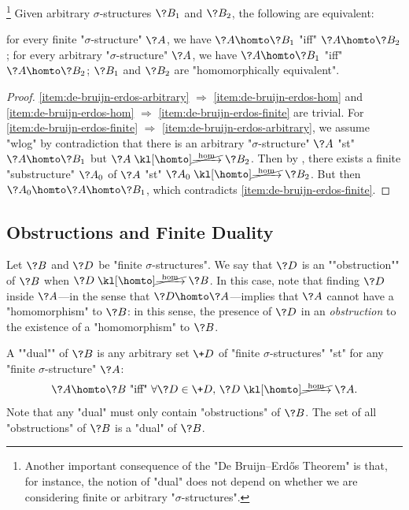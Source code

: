 \begin{corollary}
	\!\footnote{Another important consequence of the "De Bruijn–Erdős Theorem" is that,
	for instance, the notion of "dual" does not depend on whether we are considering finite or
	arbitrary "$\sigma$-structures".}
	\AP\label{coro:de-bruijn-erdos}
	Given arbitrary $\sigma$-structures $\?B_1$ and $\?B_2$, the following are equivalent:
	\begin{enumerate}
		\itemAP\label{item:de-bruijn-erdos-finite} for every finite "$\sigma$-structure" $\?A$, we have $\?A \homto \?B_1$
		"iff" $\?A \homto \?B_2$;
		\itemAP\label{item:de-bruijn-erdos-arbitrary} for every arbitrary "$\sigma$-structure" $\?A$, we have $\?A \homto \?B_1$
			"iff" $\?A \homto \?B_2$;
		\itemAP\label{item:de-bruijn-erdos-hom} $\?B_1$ and $\?B_2$ are "homomorphically equivalent".
	\end{enumerate}
\end{corollary}
\begin{proof}
	\eqref{item:de-bruijn-erdos-arbitrary} $\Rightarrow$ \eqref{item:de-bruijn-erdos-hom}
	and \eqref{item:de-bruijn-erdos-hom} $\Rightarrow$ \eqref{item:de-bruijn-erdos-finite}
	are trivial.
	For \eqref{item:de-bruijn-erdos-finite} $\Rightarrow$ \eqref{item:de-bruijn-erdos-arbitrary},
	we assume "wlog" by contradiction that there is an arbitrary "$\sigma$-structure" $\?A$ "st" $\?A \homto \?B_1$ but $\?A \nothomto \?B_2$. Then by ,
	there exists a finite "substructure" $\?A_0$ of $\?A$ "st" $\?A_0 \nothomto \?B_2$.
	But then $\?A_0 \homto \?A \homto \?B_1$, which contradicts \eqref{item:de-bruijn-erdos-finite}.
\end{proof}


\subsection{Obstructions and Finite Duality}

Let $\?B$ and $\?D$ be "finite $\sigma$-structures".
We say that $\?D$ is an \AP""obstruction"" of $\?B$ when $\?D \nothomto \?B$.
In this case, note that finding $\?D$ inside $\?A$---in the sense that $\?D \homto \?A$---implies that $\?A$ cannot have a "homomorphism" to $\?B$: in this sense, the presence of
$\?D$ in an \emph{obstruction} to the existence of a "homomorphism" to $\?B$.

A \AP""dual"" of $\?B$ is any arbitrary set $\+D$ of "finite $\sigma$-structures" "st"
for any "finite $\sigma$-structure" $\?A$:
\[
	\?A \homto \?B
	\text{ "iff" }
	\forall \?D \in \+D,\, \?D \nothomto \?A.
\]
Note that any "dual" must only contain "obstructions" of $\?B$.%
The set of all "obstructions" of $\?B$ is a "dual" of $\?B$.

